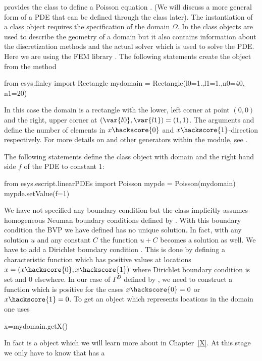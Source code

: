 \escript provides the class \Poisson to define a Poisson equation .
(We will discuss a more general form of a PDE  
that can be defined through the \LinearPDE class later). The instantiation of
a \Poisson class object requires the specification of the domain $\Omega$. In \escript
the \Domain class objects are used to describe the geometry of a domain but it also
contains information about the discretization methods and the actual solver which is used
to solve the PDE. Here we are using the FEM library \finley {}. The following statements create the \Domain object  from the 
\finley method 
\begin{python}
from esys.finley import Rectangle
mydomain = Rectangle(l0=1.,l1=1.,n0=40, n1=20)
\end{python}
In this case the domain is a rectangle with the lower, left corner at point $(0,0)$ and
the right, upper corner at $(\var{l0},\var{l1})=(1,1)$.
The arguments  and  define the number of elements in $x\hackscore{0}$ and
$x\hackscore{1}$-direction respectively. For more details on  and
other \Domain generators within the \finley module,
see .

The following statements define the \Poisson class object  with domain  and
the right hand side $f$ of the PDE to constant $1$: 
\begin{python}
from esys.escript.linearPDEs import Poisson
mypde = Poisson(mydomain)
mypde.setValue(f=1)
\end{python}
We have not specified any boundary condition but the 
\Poisson class implicitly assumes homogeneous Neuman boundary conditions  defined by . With this boundary 
condition the BVP we have defined has no unique solution. In fact, with any solution $u$
and any constant $C$ the function $u+C$ becomes a solution as well. We have to add 
a Dirichlet boundary condition . This is done 
by defining a characteristic function  
which has positive values at locations $x=(x\hackscore{0},x\hackscore{1})$ where Dirichlet boundary condition is set
and $0$ elsewhere. In our case of $\Gamma^D$ defined by ,
we need to construct a function  which is positive for the cases $x\hackscore{0}=0$ or $x\hackscore{1}=0$. To get 
an object  which represents locations in the domain one uses
\begin{python}
x=mydomain.getX() 
\end{python}
In fact  is a \Data object which we will learn more about in Chapter~\ref{X}. At this stage we only have to know
that  has a 

